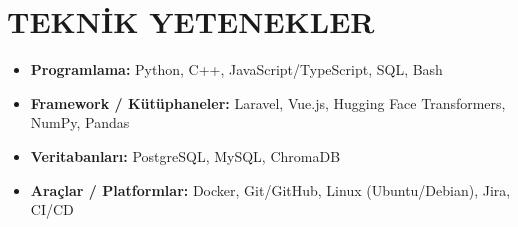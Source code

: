 
\section{TEKNİK YETENEKLER}

\begin{itemize}
    \item \textbf{Programlama:} Python, C++, JavaScript/TypeScript, SQL, Bash
    \item \textbf{Framework / Kütüphaneler:} Laravel, Vue.js, Hugging Face Transformers, NumPy, Pandas
    \item \textbf{Veritabanları:} PostgreSQL, MySQL, ChromaDB
    \item \textbf{Araçlar / Platformlar:} Docker, Git/GitHub, Linux (Ubuntu/Debian), Jira, CI/CD
\end{itemize}
